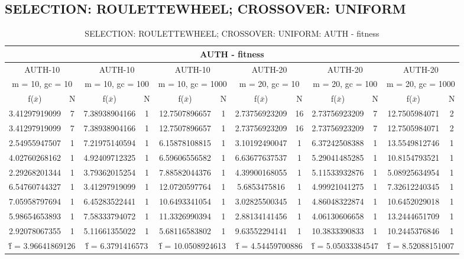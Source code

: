 \subsection{SELECTION: ROULETTEWHEEL; CROSSOVER: UNIFORM}
\begin{table}[H]
	\centering
	\caption{SELECTION: ROULETTEWHEEL; CROSSOVER: UNIFORM: AUTH - fitness}
	\begin{adjustbox}{width=1\textwidth}
		\begin{tabular}{ |c|c||c|c||c|c||c|c||c|c||c|c| }
			\hline
			\multicolumn{12}{|c|}{AUTH - fitness} \\
			\hline
			\multicolumn{2}{|c||}{AUTH-10} & \multicolumn{2}{c||}{AUTH-10} & \multicolumn{2}{c||}{AUTH-10} & \multicolumn{2}{c||}{AUTH-20} & \multicolumn{2}{c||}{AUTH-20} & \multicolumn{2}{c|}{AUTH-20}\\
			\hline
			\multicolumn{2}{|c||}{m = 10, gc = 10} & \multicolumn{2}{c||}{m = 10, gc = 100} & \multicolumn{2}{c||}{m = 10, gc = 1000} & \multicolumn{2}{c||}{m = 20, gc = 10} & \multicolumn{2}{c||}{m = 20, gc = 100} & \multicolumn{2}{c|}{m = 20, gc = 1000}\\
			\hline
			f($\bar{x}$) & N & f($\bar{x}$) & N & f($\bar{x}$) & N & f($\bar{x}$) & N & f($\bar{x}$) & N & f($\bar{x}$) & N\\
			\hline
			\hline
			3.41297919099 & 7 & 7.38938904166 & 1 & 12.7507896657 & 1 & 2.73756923209 & 16 & 2.73756923209 & 7 & 12.7505984071 & 2\\
			\hline
			3.41297919099 & 7 & 7.38938904166 & 1 & 12.7507896657 & 1 & 2.73756923209 & 16 & 2.73756923209 & 7 & 12.7505984071 & 2\\
			2.54955947507 & 1 & 7.21975140594 & 1 & 6.15878108815 & 1 & 3.10192490047 & 1 & 6.37242508388 & 1 & 13.5549812746 & 1\\
			4.02760268162 & 1 & 4.92409712325 & 1 & 6.59606556582 & 1 & 6.63677637537 & 1 & 5.29041485285 & 1 & 10.8154793521 & 1\\
			2.29268201344 & 1 & 3.79362015254 & 1 & 7.88582044376 & 1 & 4.39900168055 & 1 & 5.11533932876 & 1 & 5.08925634954 & 1\\
			6.54760744327 & 1 & 3.41297919099 & 1 & 12.0720597764 & 1 & 5.6853475816 & 1 & 4.99921041275 & 1 & 7.32612240345 & 1\\
			7.05958797694 & 1 & 6.45283522441 & 1 & 10.6493341054 & 1 & 3.02825500345 & 1 & 4.86048322874 & 1 & 10.6452029018 & 1\\
			5.98654653893 & 1 & 7.58333794072 & 1 & 11.3326990394 & 1 & 2.88134141456 & 1 & 4.06130606658 & 1 & 13.2444651709 & 1\\
			2.92078067355 & 1 & 5.11661355022 & 1 & 5.68116583802 & 1 & 9.63552294141 & 1 & 10.3833390833 & 1 & 10.2445376846 & 1\\
			\hline
			\multicolumn{2}{|c||}{\^{f} = 3.96641869126} & \multicolumn{2}{c||}{\^{f} = 6.3791416573} & \multicolumn{2}{c||}{\^{f} = 10.0508924613} & \multicolumn{2}{c||}{\^{f} = 4.54459700886} & \multicolumn{2}{c||}{\^{f} = 5.05033384547} & \multicolumn{2}{c|}{\^{f} = 8.52088151007}\\
			\hline
		\end{tabular}
	\end{adjustbox}
\end{table}
